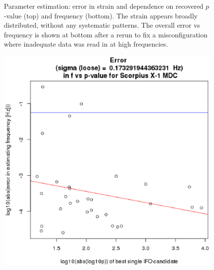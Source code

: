 \begin{figure}
\begin{center}
\caption{Parameter estimation: error in strain and dependence on recovered $p$-value (top) and frequency (bottom). 
The strain appears broadly distributed, without any systematic patterns. 
The overall error vs frequency is shown at bottom after a rerun to fix a misconfiguration where inadequate data was read in at high frequencies.
\label{fig:errorh0}}
\end{center}
\end{figure}


\begin{figure}
\begin{center}
\includegraphics[trim=0 10 10 15, clip, width=0.52\paperwidth,height=0.36\paperheight]{ErrorF.eps}

\end{center}
\end{figure}
